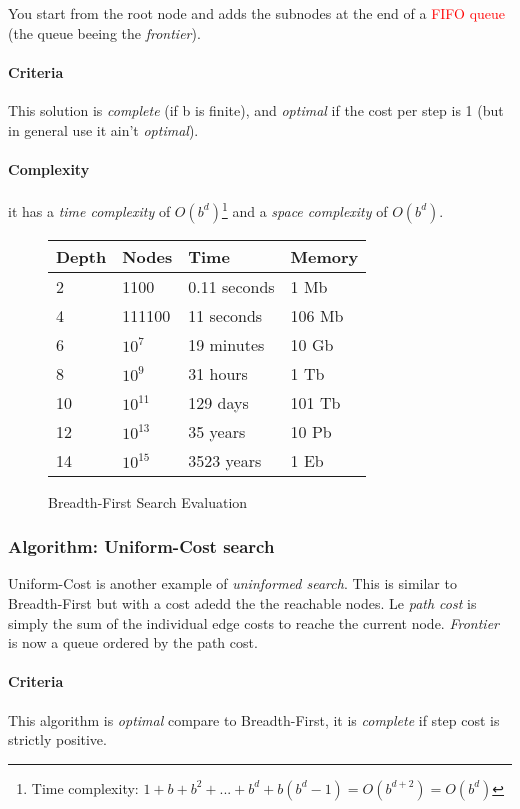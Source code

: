 You start from the root node and adds the subnodes at the end of a 
\textcolor{red}{FIFO queue} (the queue beeing the \textit{frontier}). 

\paragraph{Criteria}
This solution is \textit{complete} (if b is finite), and \textit{optimal} if the cost per
step is 1 (but in general use it ain't \textit{optimal}).

\paragraph{Complexity}
it has a \textit{time complexity} of $O(b^d)$\footnote{Time complexity: $1+b+b^2+...+b^d+b(b^d-1) = O(b^{d+2}) = O(b^d)$} and a \textit{space complexity} of $O(b^d)$. 

\begin{figure}[h]
\centering
\begin{tabular}{|llll|}
\hline
\textbf{Depth} & \textbf{Nodes} & \textbf{Time} & \textbf{Memory} \\
\hline
2 & 1100 & 0.11 seconds & 1 Mb \\
4 & 111100 & 11 seconds & 106 Mb \\
6 & $10^7$ & 19 minutes & 10 Gb \\
8 & $10^9$ & 31 hours & 1 Tb \\
10 & $10^{11}$ & 129 days & 101 Tb \\
12 & $10^{13}$ & 35 years & 10 Pb \\
14 & $10^{15}$ & 3523 years & 1 Eb \\
\hline
\end{tabular}
\caption{Breadth-First Search Evaluation}
\end{figure}

\subsubsection{Algorithm: Uniform-Cost search}

Uniform-Cost is another example of \textit{uninformed search}. This is similar to Breadth-First but with a cost adedd the the reachable nodes. Le \textit{path cost} is simply the sum of the individual edge costs to reache the current node. \textit{Frontier} is now a queue ordered by the path cost.

\paragraph{Criteria}
This algorithm is \textit{optimal} compare to Breadth-First, it is \textit{complete} if step cost is strictly positive.

